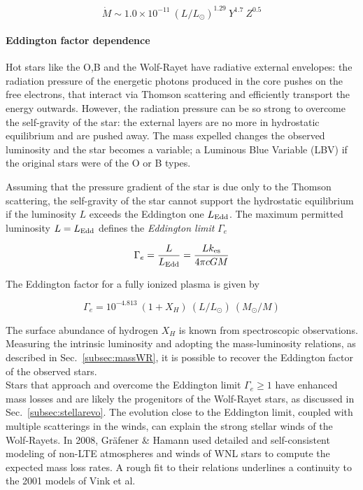 \documentclass[a4paper,titlepage]{book}     	%
\newcommand{\mdot}{\ensuremath{\dot{M}}}
\begin{document}
\begin{equation}\label{eq:NugisLamers2000}
	\mdot \sim 1.0 \times 10^{-11}~(L/L_\odot)^{1.29}~Y^{1.7}~Z^{0.5}
\end{equation}

\paragraph{Eddington factor dependence}
Hot stars like the O,B and the Wolf-Rayet have radiative external envelopes: the radiation pressure of the energetic photons produced in the core pushes on the free electrons, that interact via Thomson scattering and efficiently transport the energy outwards. However, the radiation pressure can be so strong to overcome the self-gravity of the star: the external layers are no more in hydrostatic equilibrium and are pushed away. The mass expelled changes the observed luminosity and the star becomes a variable; a Luminous Blue Variable (LBV) if the original stars were of the O or B types.

Assuming that the pressure gradient of the star is due only to the Thomson scattering, the self-gravity of the star cannot support the hydrostatic equilibrium if the luminosity $L$ exceeds the Eddington one $L_{\rm Edd}$. The maximum permitted luminosity $L=L_{\rm Edd}$ defines the \emph{Eddington limit} $\Gamma_e$

\begin{equation}\label{eqn:Eddingtonfactor}
\Gamma_e = \frac{L}{L_\textup{Edd}} = \frac{L k_\textup{es}}{4 \pi c G M}
\end{equation}

The Eddington factor for a fully ionized plasma is given by

\begin{equation}\label{eq:EddingtonObserved}
\Gamma_e = 10^{-4.813}~(1+X_H)~(L/L_\odot)~(M_\odot/M)
\end{equation}

The surface abundance of hydrogen $X_H$ is known from spectroscopic observations. Measuring the intrinsic luminosity and adopting the mass-luminosity relations, as described in Sec.\ \ref{subsec:massWR}, it is possible to recover the Eddington factor of the observed stars.\\


Stars that approach and overcome the Eddington limit $\Gamma_e \geq 1$ have enhanced mass losses and are likely the progenitors of the Wolf-Rayet stars, as discussed in Sec.\ \ref{subsec:stellarevo}. The evolution close to the Eddington limit, coupled with multiple scatterings in the winds, can explain the strong stellar winds of the Wolf-Rayets. In 2008, Gr{\"a}fener \& Hamann \cite{G&H_WRmassloss} used detailed and self-consistent modeling of non-LTE atmospheres and winds of WNL stars to compute the expected mass loss rates. A rough fit \cite{parsec2015_chen} to their relations underlines a continuity to the 2001 models of Vink et al.\
\end{document}
